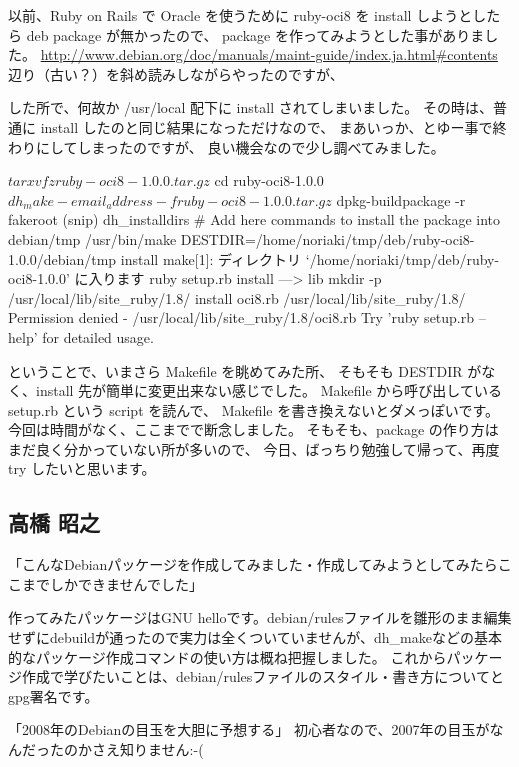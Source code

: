 \documentclass[mingoth,a4paper]{jsarticle}
\begin{document}
以前、Ruby on Rails で Oracle を使うために
ruby-oci8 を install しようとしたら deb package が無かったので、
package を作ってみようとした事がありました。
\url{http://www.debian.org/doc/manuals/maint-guide/index.ja.html#contents}
辺り（古い？）を斜め読みしながらやったのですが、
した所で、何故か /usr/local 配下に install されてしまいました。
その時は、普通に install したのと同じ結果になっただけなので、
まあいっか、とゆー事で終わりにしてしまったのですが、
良い機会なので少し調べてみました。
\begin{commandline}
 
 $ tar xvfz ruby-oci8-1.0.0.tar.gz
 $ cd ruby-oci8-1.0.0
 $ dh_make -e mail_address -f ruby-oci8-1.0.0.tar.gz
 $ dpkg-buildpackage -r fakeroot
 (snip)
 dh_installdirs
 # Add here commands to install the package into debian/tmp
 /usr/bin/make DESTDIR=/home/noriaki/tmp/deb/ruby-oci8-1.0.0/debian/tmp install
 make[1]: ディレクトリ `/home/noriaki/tmp/deb/ruby-oci8-1.0.0' に入ります
 ruby setup.rb install
 ---> lib
 mkdir -p /usr/local/lib/site_ruby/1.8/
 install oci8.rb /usr/local/lib/site_ruby/1.8/
 Permission denied - /usr/local/lib/site_ruby/1.8/oci8.rb
 Try 'ruby setup.rb --help' for detailed usage.
\end{commandline}
ということで、いまさら Makefile を眺めてみた所、
そもそも DESTDIR がなく、install 先が簡単に変更出来ない感じでした。
Makefile から呼び出している setup.rb という script を読んで、
Makefile を書き換えないとダメっぽいです。
今回は時間がなく、ここまでで断念しました。
そもそも、package の作り方はまだ良く分かっていない所が多いので、
今日、ばっちり勉強して帰って、再度 try したいと思います。

\subsection{高橋 昭之}

「こんなDebianパッケージを作成してみました・作成してみようとしてみたらここまでしかできませんでした」

作ってみたパッケージはGNU helloです。debian/rulesファイルを雛形のまま編集せずにdebuildが通ったので実力は全くついていませんが、dh\_makeなどの基本的なパッケージ作成コマンドの使い方は概ね把握しました。
これからパッケージ作成で学びたいことは、debian/rulesファイルのスタイル・書き方についてとgpg署名です。

「2008年のDebianの目玉を大胆に予想する」
初心者なので、2007年の目玉がなんだったのかさえ知りません:-(
\end{document}
